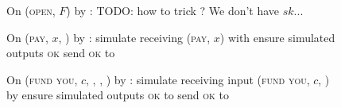 \begin{figure}[H]
  \begin{simulatorbox}{\simulator}
    \begin{algorithmic}[1]
      \State On (\textsc{open}, $F$) by \fchan:
      \Indent
        \State TODO: how to trick \environment? We don't have $sk$...
      \EndIndent
      \Statex

      \State On (\textsc{pay}, $x$, \dave) by \fchan:
      \Indent
        \State simulate receiving (\textsc{pay}, $x$) with \dave
        \State ensure simulated \dave outputs \textsc{ok}
        \State send \textsc{ok} to \fchan
      \EndIndent
      \Statex

      \State On (\textsc{fund you}, $c$, \bob, \charlie, \alice) by \fchan:
      \Indent
        \State simulate \alice receiving input (\textsc{fund you}, $c$, \bob) by
        \charlie
        \State ensure simulated \alice outputs \textsc{ok} to \charlie
        \State send \textsc{ok} to \fchan
      \EndIndent
    \end{algorithmic}
  \end{simulatorbox}
  \caption{}
  \label{code:simulator}
\end{figure}
